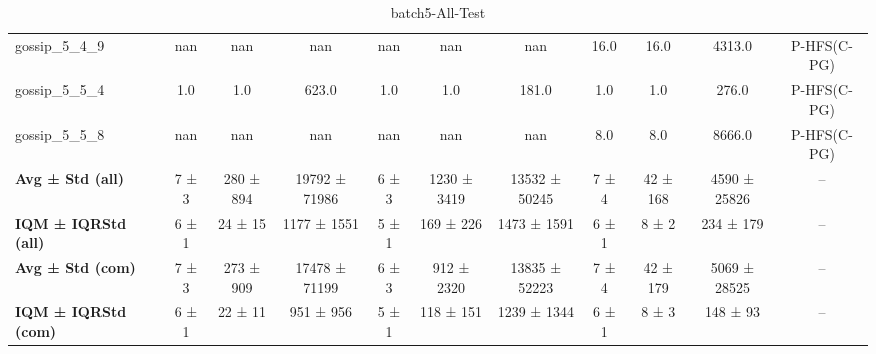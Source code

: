 \begin{table}[!ht]
\begin{tabular}{l|ccc|ccc|cccc}
gossip\_5\_4\_9 & nan & nan & nan & nan & nan & nan & 16.0 & 16.0 & 4313.0 & P-HFS(C-PG) \\
gossip\_5\_5\_4 & 1.0 & 1.0 & 623.0 & 1.0 & 1.0 & 181.0 & 1.0 & 1.0 & 276.0 & P-HFS(C-PG) \\
gossip\_5\_5\_8 & nan & nan & nan & nan & nan & nan & 8.0 & 8.0 & 8666.0 & P-HFS(C-PG) \\
\hline
\textbf{Avg ± Std (all)} & 7 ± 3 & 280 ± 894 & 19792 ± 71986 & 6 ± 3 & 1230 ± 3419 & 13532 ± 50245 & 7 ± 4 & 42 ± 168 & 4590 ± 25826 & -- \\
\textbf{IQM ± IQRStd (all)} & 6 ± 1 & 24 ± 15 & 1177 ± 1551 & 5 ± 1 & 169 ± 226 & 1473 ± 1591 & 6 ± 1 & 8 ± 2 & 234 ± 179 & -- \\
\textbf{Avg ± Std (com)} & 7 ± 3 & 273 ± 909 & 17478 ± 71199 & 6 ± 3 & 912 ± 2320 & 13835 ± 52223 & 7 ± 4 & 42 ± 179 & 5069 ± 28525 & -- \\
\textbf{IQM ± IQRStd (com)} & 6 ± 1 & 22 ± 11 & 951 ± 956 & 5 ± 1 & 118 ± 151 & 1239 ± 1344 & 6 ± 1 & 8 ± 3 & 148 ± 93 & -- \\
\end{tabular}
\caption{batch5-All-Test}
\label{tab:batch5_All_comparison_test}
\end{table}

